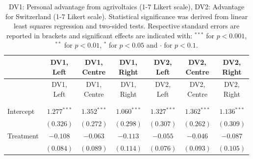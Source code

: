
\begin{center}
\begin{small}
\begin{longtable}{l@{} c@{} c@{} c@{} c@{} c@{} c@{}}
\hline
 & \shortstack{\rule{0pt}{2.2ex}DV1,\\Left} & \shortstack{\rule{0pt}{2.2ex}DV1,\\Centre} & \shortstack{\rule{0pt}{2.2ex}DV1,\\Right} & \shortstack{\rule{0pt}{2.2ex}DV2,\\Left} & \shortstack{\rule{0pt}{2.2ex}DV2,\\Centre} & \shortstack{\rule{0pt}{2.2ex}DV2,\\Right} \\
\hline
\endfirsthead
\hline
 & \shortstack{\rule{0pt}{2.2ex}DV1,\\Left} & \shortstack{\rule{0pt}{2.2ex}DV1,\\Centre} & \shortstack{\rule{0pt}{2.2ex}DV1,\\Right} & \shortstack{\rule{0pt}{2.2ex}DV2,\\Left} & \shortstack{\rule{0pt}{2.2ex}DV2,\\Centre} & \shortstack{\rule{0pt}{2.2ex}DV2,\\Right} \\
\hline
\endhead
\hline
\endfoot
\hline
\multicolumn{7}{l}{\tiny{
}}\\
\caption{DV1: Personal advantage from agrivoltaics (1-7 Likert scale), DV2: Advantage for Switzerland (1-7 Likert scale). Statistical significance was derived from linear least squares regression and two-sided tests. 
                Respective standard errors are reported in brackets and significant effects are indicated with: $^{***}$ for $p < 0.001$, $^{**}$ for $p < 0.01$, $^*$ for $p < 0.05$ and $\cdot$ for $p < 0.1$.}
\label{table:coefficients}
\endlastfoot \\
Intercept                           & $1.277^{***}$    & $1.352^{***}$ & $1.060^{***}$ & $1.327^{***}$   & $1.362^{***}$ & $1.136^{***}$    \\
                                    & $(0.326)$        & $(0.272)$     & $(0.298)$     & $(0.307)$       & $(0.262)$     & $(0.309)$        \\
Treatment                           & $-0.108$         & $-0.063$      & $-0.113$      & $-0.055$        & $-0.046$      & $-0.087$         \\
                                    & $(0.084)$        & $(0.089)$     & $(0.114)$     & $(0.076)$       & $(0.093)$     & $(0.105)$        \\

\end{longtable}
\end{small}
\end{center}
